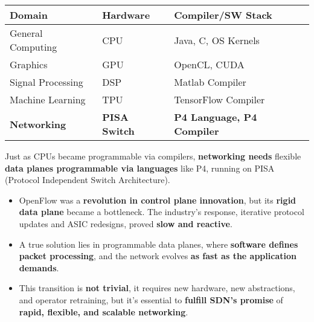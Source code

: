 \begin{table}[!htp]
    \centering
    \begin{tabular}{@{} l | l | l @{}}
        \toprule
        \textbf{Domain} & \textbf{Hardware} & \textbf{Compiler/SW Stack} \\
        \midrule
        General Computing & CPU             & Java, C, OS Kernels          \\ [.3em]
        Graphics          & GPU             & OpenCL, CUDA                 \\ [.3em]
        Signal Processing & DSP             & Matlab Compiler              \\ [.3em]
        Machine Learning  & TPU             & TensorFlow Compiler          \\ [.3em]
        \textbf{Networking} & \textbf{PISA Switch} & \textbf{P4 Language, P4 Compiler} \\
        \bottomrule
    \end{tabular}
\end{table}

\noindent
Just as CPUs became programmable via compilers, \textbf{networking needs} flexible \textbf{data planes programmable via languages} like P4, running on PISA (Protocol Independent Switch Architecture).

\highspace
\begin{takeawaysbox}
    \begin{itemize}
        \item OpenFlow was a \textbf{revolution in control plane innovation}, but its \textbf{rigid data plane} became a bottleneck. The industry's response, iterative protocol updates and ASIC redesigns, proved \textbf{slow and reactive}.

        \item A true solution lies in programmable data planes, where \textbf{software defines packet processing}, and the network evolves \textbf{as fast as the application demands}.

        \item This transition is \textbf{not trivial}, it requires new hardware, new abstractions, and operator retraining, but it's essential to \textbf{fulfill SDN's promise} of \textbf{rapid, flexible, and scalable networking}.
    \end{itemize}
\end{takeawaysbox}
